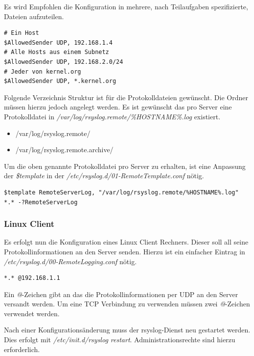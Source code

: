 \begin{informationnote}
Es wird Empfohlen die Konfiguration in mehrere, nach Teilaufgaben spezifizierte, Dateien aufzuteilen.
\end{informationnote}

\begin{lstlisting}
# Ein Host
$AllowedSender UDP, 192.168.1.4
# Alle Hosts aus einem Subnetz
$AllowedSender UDP, 192.168.2.0/24
# Jeder von kernel.org
$AllowedSender UDP, *.kernel.org
\end{lstlisting}

Folgende Verzeichnis Struktur ist für die Protokolldateien gewünscht. Die Ordner müssen hierzu jedoch angelegt werden. Es ist gewünscht das pro Server eine Protokolldatei in \textit{/var/log/rsyslog.remote/\%HOSTNAME\%.log} existiert.

\begin{itemize}
\item /var/log/rsyslog.remote/
\item /var/log/rsyslog.remote.archive/
\end{itemize}

Um die oben genannte Protokolldatei pro Server zu erhalten, ist eine Anpassung der \textit{\$template} in der \textit{/etc/rsyslog.d/01-RemoteTemplate.conf} nötig. \cite{RsyslogSeparateLog}

\begin{lstlisting}
$template RemoteServerLog, "/var/log/rsyslog.remote/%HOSTNAME%.log"
*.* -?RemoteServerLog
\end{lstlisting}

\subsubsection{Linux Client}
Es erfolgt nun die Konfiguration eines Linux Client Rechners. Dieser soll all seine Protokollinformationen an den Server senden. Hierzu ist ein einfacher Eintrag in \textit{/etc/rsyslog.d/00-RemoteLogging.conf} nötig.

\begin{lstlisting}
*.*	@192.168.1.1
\end{lstlisting}

Ein \textit{@}-Zeichen gibt an das die Protokollinformationen per UDP an den Server versandt werden. Um eine TCP Verbindung zu verwenden müssen zwei \textit{@}-Zeichen verwendet werden.

\begin{importantnote}
Nach einer Konfigurationsänderung muss der rsyslog-Dienst neu gestartet werden. Dies erfolgt mit \textit{/etc/init.d/rsyslog restart}. Administrationsrechte sind hierzu erforderlich.
\end{importantnote}

